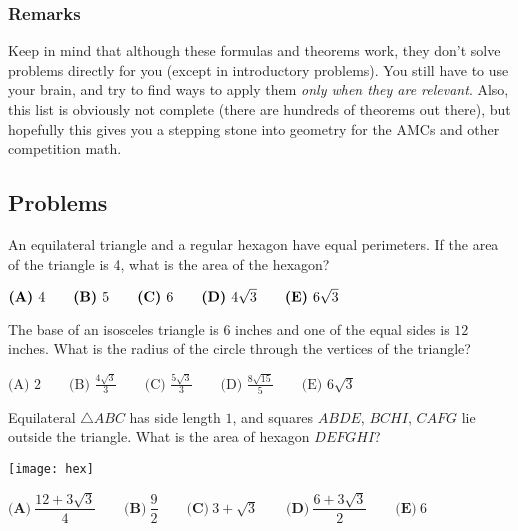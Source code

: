 \subsubsection{Remarks}
Keep in mind that although these formulas and theorems work, they don't solve problems directly for you (except in introductory problems). You still have to use your brain, and try to find ways to apply them \textit{only when they are relevant}. Also, this list is obviously not complete (there are hundreds of theorems out there), but hopefully this gives you a stepping stone into geometry for the AMCs and other competition math.

\subsection{Problems}
\begin{problem}
An equilateral triangle and a regular hexagon have equal perimeters. If the area of the triangle is 4, what is the area of the hexagon? \vspace{0.2in}

$\textbf{(A)}\hspace{.05in}4\qquad\textbf{(B)}\hspace{.05in}5\qquad\textbf{(C)}\hspace{.05in}6\qquad\textbf{(D)}\hspace{.05in}4\sqrt3\qquad\textbf{(E)}\hspace{.05in}6\sqrt3$
\end{problem} 

\begin{problem}
The base of an isosceles triangle is $6$ inches and one of the equal sides is $12$ inches. What is the radius of the circle through the vertices of the triangle? \vspace{0.2in}

$\textrm{(A) } 2 \qquad \textrm{(B) } \frac{4 \sqrt {3}}{3} \qquad \textrm{(C) } \frac{5\sqrt{3}}{3} \qquad \textrm{(D) } \frac{8\sqrt{15}}{5} \qquad \textrm{(E) } 6 \sqrt {3}$
\end{problem}

\begin{problem}
Equilateral $\triangle ABC$ has side length $1$, and squares $ABDE$, $BCHI$, $CAFG$ lie outside the triangle. What is the area of hexagon $DEFGHI$?
\begin{center}
\texttt{[image: hex]}
\end{center}
$\textbf{(A)}\ \dfrac{12+3\sqrt3}4\qquad\textbf{(B)}\ \dfrac92\qquad\textbf{(C)}\ 3+\sqrt3\qquad\textbf{(D)}\ \dfrac{6+3\sqrt3}2\qquad\textbf{(E)}\ 6$
\end{problem}

